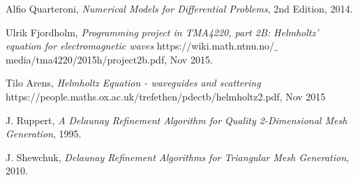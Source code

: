\documentclass[10pt,a4paper]{article}
\begin{document}
\begin{thebibliography}{}

Alfio Quarteroni, \emph{Numerical Models for Differential Problems}, 2nd Edition, 2014.

Ulrik Fjordholm, \emph{Programming project in TMA4220, part 2B:
Helmholtz' equation for electromagnetic waves} https://wiki.math.ntnu.no/$\_$media/tma4220/2015h/project2b.pdf, Nov 2015.

Tilo Arens, \emph{Helmholtz Equation - waveguides and scattering} https://people.maths.ox.ac.uk/trefethen/pdectb/helmholtz2.pdf, Nov 2015

J. Ruppert, \emph{A Delaunay Refinement Algorithm for Quality 2-Dimensional Mesh Generation}, 1995.

J. Shewchuk, \emph{Delaunay Refinement Algorithms for Triangular Mesh Generation}, 2010.



\end{thebibliography}
\end{document}

